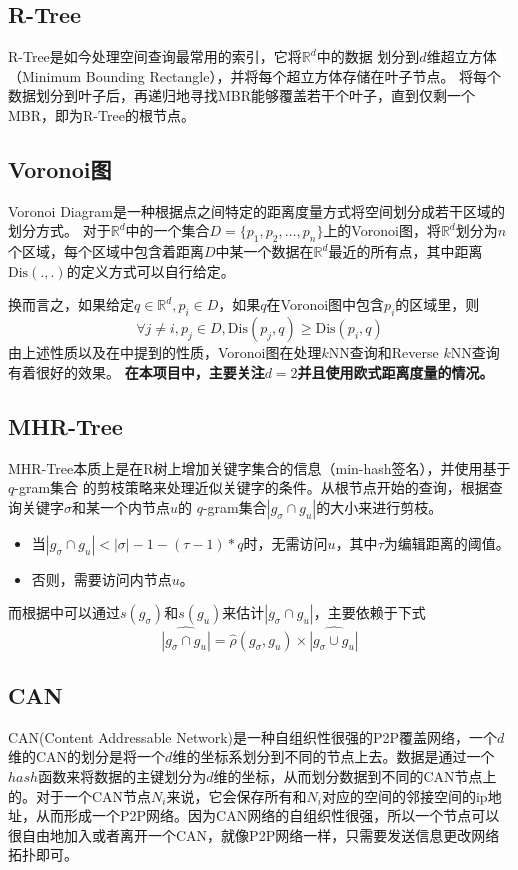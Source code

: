 \documentclass{ML}
\begin{document}
\subsection{R-Tree}
R-Tree\cite{R-Tree}是如今处理空间查询最常用的索引，它将$\mathbb{R}^d$中的数据
划分到$d$维超立方体（Minimum Bounding Rectangle），并将每个超立方体存储在叶子节点。
将每个数据划分到叶子后，再递归地寻找MBR能够覆盖若干个叶子，直到仅剩一个MBR，即为R-Tree的根节点。

\subsection{Voronoi图}
Voronoi Diagram\cite{Voronoi-Diagram}是一种根据点之间特定的距离度量方式将空间划分成若干区域的划分方式。
对于$\mathbb{R}^d$中的一个集合$D = \{p_1, p_2, \dots, p_n\}$上的Voronoi图，将$\mathbb{R}^d$划分为$n$
个区域，每个区域中包含着距离$D$中某一个数据在$\mathbb{R}^d$最近的所有点，其中距离$\mathrm{Dis}(.,.)$的定义方式可以自行给定。

换而言之，如果给定$q \in \mathbb{R}^d, p_i \in D$，如果$q$在Voronoi图中包含$p_i$的区域里，则
$$\forall j \neq i, p_j \in D, \mathrm{Dis}(p_j, q) \ge \mathrm{Dis}(p_i, q)$$
由上述性质以及在\cite{VD-Property}中提到的性质，Voronoi图在处理$k$NN查询和Reverse $k$NN查询有着很好的效果。
\textbf{在本项目中，主要关注$d = 2$并且使用欧式距离度量的情况。}

\subsection{MHR-Tree}
MHR-Tree\cite{MHR-Tree}本质上是在R树上增加关键字集合的信息（min-hash签名），并使用基于$q$-gram集合
的剪枝策略来处理近似关键字的条件。从根节点开始的查询，根据查询关键字$\sigma$和某一个内节点$u$的
$q$-gram集合$|g_{\sigma} \cap g_u|$的大小来进行剪枝。
\begin{itemize}
    \item 当$|g_{\sigma} \cap g_u| < |\sigma| - 1 - (\tau - 1) * q$时，无需访问$u$，其中$\tau$为编辑距离的阈值。
    \item 否则，需要访问内节点$u$。
\end{itemize}
而根据\cite{MHR-Tree}中可以通过$s(g_{\sigma})$和$s(g_{u})$来估计$|g_{\sigma} \cap g_u|$，主要依赖于下式
$$ \widehat{|g_{\sigma} \cap g_u|} = \hat{\rho}(g_{\sigma}, g_u) \times \widehat{|g_{\sigma} \cup g_u|}$$

\subsection{CAN}
CAN(Content Addressable Network)是一种自组织性很强的P2P覆盖网络，一个$d$维的CAN的划分是将一个$d$维的坐标系划分到不同的节点上去。数据是通过一个$hash$函数来将数据的主键划分为$d$维的坐标，从而划分数据到不同的CAN节点上的。对于一个CAN节点$N_i$来说，它会保存所有和$N_i$对应的空间的邻接空间的ip地址，从而形成一个P2P网络。因为CAN网络的自组织性很强，所以一个节点可以很自由地加入或者离开一个CAN，就像P2P网络一样，只需要发送信息更改网络拓扑即可。
\end{document}
